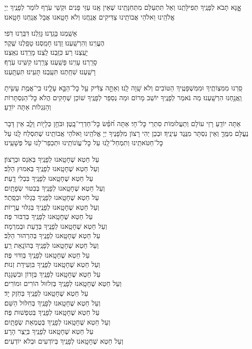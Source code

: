 \documentclass[twoside, openany, parskip=half, 11pt]{book}
\begin{document}
אׇׇׇנָּא תָּבֹא לְפָנֶֽיךָ תְּפִילָּתֵֽנוּ וְאַל תִּתְעַלַּם מִתְּחִנָּתֵֽינוּ שֶׁאֵין אָֽנוּ עַזֵּי פָנִים וּקְשֵׁי עֹֽרֶף לוֹמַר לְפָנֶֽיךָ יְיָ אֱלֹהֵֽינוּ וֵאלֹהֵי אֲבוֹתֵֽינוּ צַדִּיקִים אֲנַֽחֲנוּ וְלֹא חָטָֽאנוּ אֲבָל אֲנַֽחְנוּ חָטָֽאנוּ׃

אָשַֽׁמְנוּ׃ בָּגַֽדְנוּ׃ גָּזַֽלְנוּ׃ דִּבַּֽרְנוּ דֹֽפִי׃ \\
הֶעֱוִֽינוּ׃ וְהִרְשַֽׁעְנוּ׃ זַֽדְנוּ׃ חָמַֽסְנוּ׃ טָפַֽלְנוּ שֶֽׁקֶר׃\\
יָעַֽצְנוּ רַע׃ כִּזַּֽבְנוּ׃ לַֽצְנוּ׃ מָרַֽדְנוּ׃ נִאַֽצְנוּ׃ \\
סָרַֽרְנוּ׃ עָוִֽינוּ׃ פָּשַֽׁעְנוּ׃ צָרַֽרְנוּ׃ קִשִּֽׁינוּ עֹֽרֶף׃\\
רָשַֽׁעְנוּ׃ שִׁחַֽתְנוּ׃ תִּעַֽבְנוּ׃ תָּעִֽינוּ׃ תִּעְתָּֽעְנוּ׃

סַֽרְנוּ מִמִּצְוֹתֶֽיךָ וּמִמִּשְׁפָּטֶֽיךָ הַטּוֹבִים וְלֹא שָֽׁוָה לָֽנוּ׃ וְאַתָּ֣ה צַדִּ֔יק עַ֖ל כׇּל־הַבָּ֣א עָלֵ֑ינוּ כִּֽי־אֱמֶ֥ת עָשִׂ֖יתָ וַֽאֲנַ֥חְנוּ הִרְשָֽׁעְנוּ׃ מַה נֹּאמַר לְפָנֶֽיךָ יוֹשֵׁב מָרוֹם וּמַה נְסַפֵּר לְפָנֶֽיךָ שׁוֹכֵן שְׁחָקִים הֲלֹא כׇּל־הַנִּסְתָּרוֹת וְהַנִּגְלוֹת אַתָּה יוֹדֵֽעַ׃

אַתָּה יוֹדֵֽעַ רָזֵי עוֹלָם וְתַעֲלוּמוֹת סִתְרֵי כׇּל־חָי׃ אַתָּה חֹ֝פֵ֗שׂ כׇּל־חַדְרֵי־בָֽטֶן׃ וּבֹּחֵ֥ן כְּלָי֖וֹת וָלֵ֑ב אֵין דָּבָר נֶעֱלָּם מִמֶּֽךָּ וְאֵין נִסְתָּר מִנֶּֽגֶד עֵינֶֽיךָ׃ וּבְכֵן יְהִי רָצוֹן מִלְּפָנֶיךָ יְיָ אֱלֹהֵֽינוּ וֵאלֹהֵי אֲבוֹתֵֽינוּ שֶׁתִּסְלַח לָֽנוּ עַל כׇּל־חַטֹּאתֵֽינוּ וְתִמְחַל־לָֽנוּ עַל כׇּל־עֲוֹנוֹתֵֽינוּ וּתְכַפֵר־לָנוּ עַל פְּשָׁעֵֽינוּ׃



עַל חֵטְא שֶׁחָטָֽאנוּ לְפָנֶֽיךָ בְּאֹֽנֵס וּבְרָצוֹן׃\\ וְעַל חֵטְא שֶׁחָטָֽאנוּ לְפָנֶֽיךָ בְּאִמוּץ הַלֵּב׃ \\
עַל חֵטְא שֶׁחָטָֽאנוּ לְפָנֶֽיךָ בִּבְלִי דָֽעַת׃ \\ וְעַל חֵטְא שֶׁחָטָֽאנוּ לְפָנֶֽיךָ בְּבִטּוּי שְׂפָתָֽיִם׃\\
עַל חֵטְא שֶׁחָטָֽאנוּ לְפָנֶֽיךָ בַּגָלוּי וּבַסָּֽתֶר׃ \\ וְעַל חֵטְא שֶׁחָטָֽאנוּ לְפָנֶֽיךָ בְּגִלּוּי עֲרָיוֹת׃ \\
עַל חֵטְא שֶׁחָטָֽאנוּ לְפָנֶֽיךָ בְּדִבּוּר פֶּה׃ \\ וְעַל חֵטְא שֶׁחָטָֽאנוּ לְפָנֶֽיךָ בְּדַֽעַת וּבְמִרְמָה׃ \\
עַל חֵטְא שֶׁחָטָֽאנוּ לְפָנֶֽיךָ בְּהִרְהוּר הַלֵּב׃ \\ וְעַל חֵטְא שֶׁחָטָֽאנוּ לְפָנֶֽיךָ בְּהוֹנָֽאַת רֵֽעַ׃ \\
עַל חֵטְא שֶׁחָטָֽאנוּ לְפָנֶֽיךָ בְּוִדּוּי פֶּה׃\\ וְעַל חֵטְא שֶׁחָטָֽאנוּ לְפָנֶֽיךָ בִּוְעִידַת זְנוּת׃ \\
עַל חֵטְא שֶׁחָטָֽאנוּ לְפָנֶֽיךָ בְּזָדוֹן וּבִשְׁגָגָה׃ \\ וְעַל חֵטְא שֶׁחָטָֽאנוּ לְפָנֶֽיךָ בְּזִלזוּל הוֹרִים וּמוֹרִים׃\\
עַל חֵטְא שֶׁחָטָֽאנוּ לְפָנֶֽיךָ בְּחֹֽזֶק יָד׃ \\ וְעַל חֵטְא שֶׁחָטָֽאנוּ לְפָנֶֽיךָ בְּחִלּוּל הַשֵּׁם׃ \\
עַל חֵטְא שֶׁחָטָֽאנוּ לְפָנֶֽיךָ בְּטִפְשׁוּת פֶּה׃ \\ וְעַל חֵטְא שֶׁחָטָֽאנוּ לְפָנֶֽיךָ בְּטֻמְאַת שְׂפָתָֽיִם׃ \\
עַל חֵטְא שֶׁחָטָֽאנוּ לְפָנֶֽיךָ בְּיֵֽצֶר הָרָע׃ \\ וְעַל חֵטְא שֶׁחָטָֽאנוּ לְפָנֶֽיךָ בְּיוֹדְעִים וּבְלֹא יוֹדְעִים׃
\end{document}
